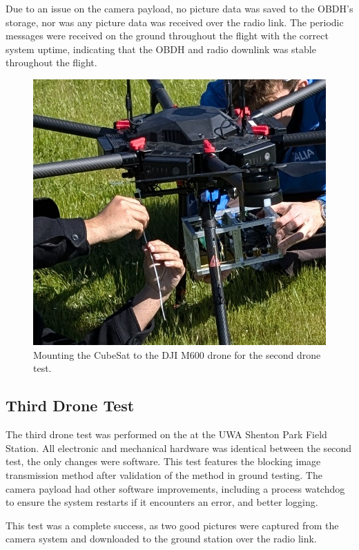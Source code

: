 \documentclass{report}
\begin{document}
Due to an issue on the camera payload, no picture data was saved to the OBDH's storage, nor was any picture data was received over the radio link. The periodic messages were received on the ground throughout the flight with the correct system uptime, indicating that the OBDH and radio downlink was stable throughout the flight.

\begin{figure}[H]
  \centering
  \includegraphics[width=\linewidth]{images/2nd_drone_test_setup.jpg}
  \caption{Mounting the CubeSat to the DJI M600 drone for the second drone test.}
  \label{fig:mounting-cubesat-drone-2}
\end{figure}

\subsection{Third Drone Test}

The third drone test was performed on the  at the UWA Shenton Park Field Station. All electronic and mechanical hardware was identical between the second test, the only changes were software. This test features the blocking image transmission method after validation of the method in ground testing. The camera payload had other software improvements, including a process watchdog to ensure the system restarts if it encounters an error, and better logging.

This test was a complete success, as two good pictures were captured from the camera system and downloaded to the ground station over the radio link.
\end{document}
